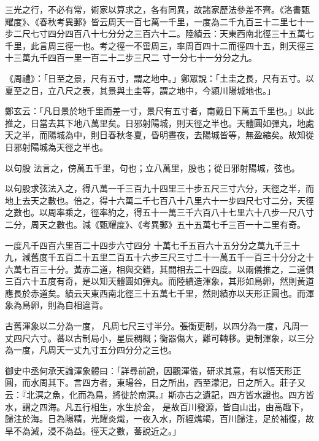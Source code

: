 \begin{pinyinscope}
 三光之行，不必有常，術家以算求之，各有同異，故諸家歷法參差不齊。《洛書甄耀度》、《春秋考異郵》皆云周天一百七萬一千里，一度為二千九百三十二里七十一步二尺七寸四分四百八十七分分之三百六十二。陸績云：天東西南北徑三十五萬七千里，此言周三徑一也。考之徑一不啻周三，率周百四十二而徑四十五，則天徑三十三萬九千四百一里一百二十二步三尺二
 寸一分七十一分分之九。



 《周禮》：「日至之景，尺有五寸，謂之地中。」鄭眾說：「土圭之長，尺有五寸。以夏至之日，立八尺之表，其景與土圭等，謂之地中，今潁川陽城地也。」



 鄭玄云：「凡日景於地千里而差一寸，景尺有五寸者，南戴日下萬五千里也。」以此推之，日當去其下地八萬里矣。日邪射陽城，則天徑之半也。天體圓如彈丸，地處天之半，而陽城為中，則日春秋冬夏，昏明晝夜，去陽城皆等，無盈縮矣。故知從日邪射陽城為天徑之半也。



 以句股
 法言之，傍萬五千里，句也；立八萬里，股也；從日邪射陽城，弦也。



 以句股求弦法入之，得八萬一千三百九十四里三十步五尺三寸六分，天徑之半，而地上去天之數也。倍之，得十六萬二千七百八十八里六十一步四尺七寸二分，天徑之數也。以周率乘之，徑率約之，得五十一萬三千六百八十七里六十八步一尺八寸二分，周天之數也。減《甄耀度》、《考異郵》五十五萬七千三百一十二里有奇。



 一度凡千四百六里百二十四步六寸四分
 十萬七千五百六十五分分之萬九千三十九，減舊度千五百二十五里二百五十六步三尺三寸二十一萬五千一百三十分分之十六萬七百三十分。黃赤二道，相與交錯，其間相去二十四度。以兩儀推之，二道俱三百六十五度有奇，是以知天體圓如彈丸。而陸績造渾象，其形如鳥卵，然則黃道應長於赤道矣。績云天東西南北徑三十五萬七千里，然則績亦以天形正圓也。而渾象為鳥卵，則為自相違背。



 古舊渾象以二分為一度，
 凡周七尺三寸半分。張衡更制，以四分為一度，凡周一丈四尺六寸。蕃以古制局小，星辰稠穊；衡器傷大，難可轉移。更制渾象，以三分為一度，凡周天一丈九寸五分四分分之三也。



 御史中丞何承天論渾象體曰：「詳尋前說，因觀渾儀，研求其意，有以悟天形正圓，而水周其下。言四方者，東暘谷，日之所出，西至濛汜，日之所入。莊子又云：『北溟之魚，化而為鳥，將徙於南溟。』斯亦古之遺記，四方皆水證也。四方皆水，謂之四海。凡五行相生，水生於金，
 是故百川發源，皆自山出，由高趣下，歸注於海。日為陽精，光耀炎熾，一夜入水，所經燋竭，百川歸注，足於補復，故旱不為減，浸不為益。徑天之數，蕃說近之。」




\end{pinyinscope}
